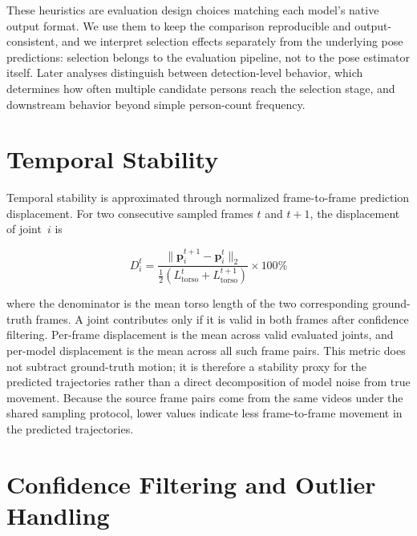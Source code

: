 These heuristics are evaluation design choices matching each model's native output format. We use them to keep the comparison reproducible and output-consistent, and we interpret selection effects separately from the underlying pose predictions: selection belongs to the evaluation pipeline, not to the pose estimator itself. Later analyses distinguish between detection-level behavior, which determines how often multiple candidate persons reach the selection stage, and downstream behavior beyond simple person-count frequency.

\section{Temporal Stability}
\label{sec:stability-method}

Temporal stability is approximated through normalized frame-to-frame prediction displacement. For two consecutive sampled frames $t$ and $t+1$, the displacement of joint~$i$ is

\begin{equation}
  D_i^t =
  \frac{\lVert \mathbf{p}_i^{t+1} - \mathbf{p}_i^t \rVert_2}
  {\frac{1}{2}(L_{\text{torso}}^{t} + L_{\text{torso}}^{t+1})}
  \times 100\%
  \label{eq:prediction-displacement}
\end{equation}

\noindent where the denominator is the mean torso length of the two corresponding ground-truth frames. A joint contributes only if it is valid in both frames after confidence filtering. Per-frame displacement is the mean across valid evaluated joints, and per-model displacement is the mean across all such frame pairs. This metric does not subtract ground-truth motion; it is therefore a stability proxy for the predicted trajectories rather than a direct decomposition of model noise from true movement. Because the source frame pairs come from the same videos under the shared sampling protocol, lower values indicate less frame-to-frame movement in the predicted trajectories.

\section{Confidence Filtering and Outlier Handling}
\label{sec:outlier-handling}

